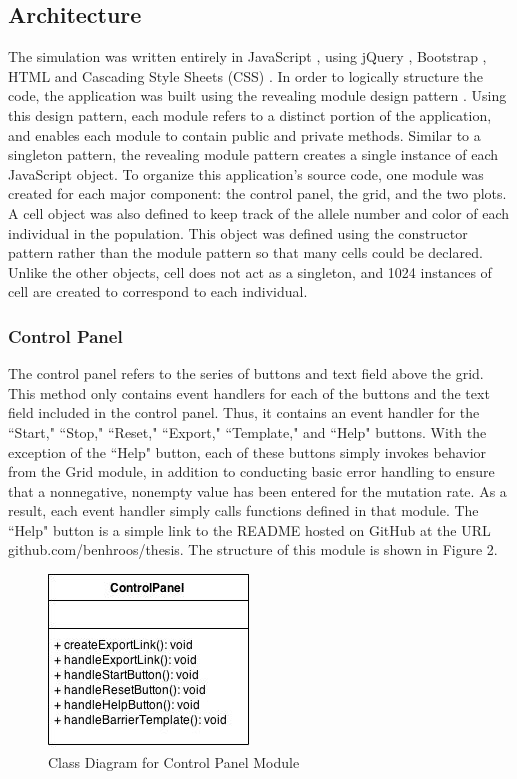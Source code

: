 \documentclass[12pt]{article}
\begin{document}
\begin{spacing}{1.5}
\subsection{Architecture}
The simulation was written entirely in JavaScript \cite{jsTutorial}, using jQuery \cite{jQuery}, Bootstrap \cite{bootstrap}, HTML \cite{htmlTutorial} and Cascading Style Sheets (CSS) \cite{cssTutorial}. In order to logically structure the code, the application was built using the revealing module design pattern \cite{js}. Using this design pattern, each module refers to a distinct portion of the application, and enables each module to contain public and private methods. Similar to a singleton pattern, the revealing module pattern creates a single instance of each JavaScript object. To organize this application's source code, one module was created for each major component: the control panel, the grid, and the two plots. A cell object was also defined to keep track of the allele number and color of each individual in the population. This object was defined using the constructor pattern \cite{js} rather than the module pattern so that many cells could be declared. Unlike the other objects, cell does not act as a singleton, and 1024 instances of cell are created to correspond to each individual.

\subsubsection{Control Panel}
The control panel refers to the series of buttons and text field above the grid. This method only contains event handlers for each of the buttons and the text field included in the control panel. Thus, it contains an event handler for the ``Start," ``Stop," ``Reset," ``Export," ``Template," and ``Help" buttons. With the exception of the ``Help" button, each of these buttons simply invokes behavior from the Grid module, in addition to conducting basic error handling to ensure that a nonnegative, nonempty value has been entered for the mutation rate. As a result, each event handler simply calls functions defined in that module. The ``Help" button is a simple link to the README hosted on GitHub at the URL github.com/benhroos/thesis. The structure of this module is shown in Figure 2.
\begin{figure}[h]
\caption{Class Diagram for Control Panel Module}
\centering
\includegraphics[scale=0.5]{control-panel-class-diagram}
\end{figure}


\end{spacing}
\end{document}
